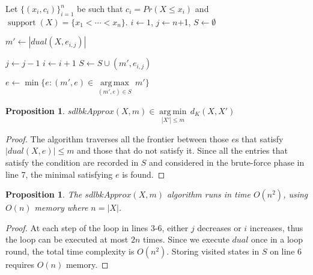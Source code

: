 \documentclass[letterpaper]{article} %
\newtheorem{proposition}[thm]{Proposition}
\DeclareMathOperator{\supp}{support}
\begin{document}
\begin{algorithm}
	\DontPrintSemicolon
	Let $\{(x_i, c_i)\}_{i=1}^n$ be such that $c_i=Pr(X \leq x_i)$ and $\supp(X)=\{x_1 < \cdots < x_n\}$.\;
    $i \gets 1$, $j \gets n$+1, $S \gets \emptyset$\;

	{	
		$m' \gets |dual(X,e_{i,j})|$\;
	
		{
			$j \gets j - 1$
		}
		 {
			$i \gets i + 1$
		}
		 {
			$S \gets S \cup (m',e_{i,j})$			
		}

	}
	$e \gets \min\{e\colon (m',e) \in \underset{(m',e)\in S}{\operatorname{arg\,max}}\, m'\}$\;
	
	\caption{$sdlbkApprox(X,m)$}   
	\label{alg:saddleback}
\end{algorithm}


\begin{proposition}\label{the:correctnessSaddleback}
	   $sdlbkApprox(X,m) {\in} \underset{|X'| \leq m }{\operatorname{arg\,min}}\, d_K(X,X')$
\end{proposition}
\begin{proof}
The algorithm traverses all the frontier between those $e$s that satisfy $|dual(X,e)| \leq m$ and those that do not satisfy it. Since all the entries that satisfy the condition are recorded in $S$ and considered in the brute-force phase in line 7, the minimal satisfying $e$ is found.
\end{proof}

\begin{proposition}\label{the:complexitySaddleback}
	The $sdlbkApprox(X,m)$ algorithm runs in time $O(n^2)$, using $O(n)$ memory where $n=|X|$.
\end{proposition}
\begin{proof}
	At each step of the loop in lines 3-6, either $j$ decreases or $i$ increases, thus the loop can be executed at most $2n$ times. Since we execute $dual$ once in a loop round, the total time complexity is $O(n^2)$. Storing visited states in $S$ on line 6 requires  $O(n)$ memory.
\end{proof}
\end{document}
